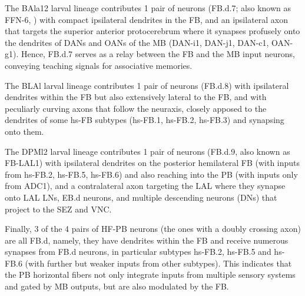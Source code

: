     The BAla12 larval lineage contributes 1 pair of neurons (FB.d.7; also known as FFN-6, \citep{eschbach2021circuits}) with compact ipsilateral dendrites in the FB, and an ipsilateral axon that targets the superior anterior protocerebrum where it synapses profusely onto the dendrites of DANs and OANs of the MB (DAN-i1, DAN-j1, DAN-c1, OAN-g1). Hence, FB.d.7 serves as a relay between the FB and the MB input neurons, conveying teaching signals for associative memories.

    The BLAl larval lineage contributes 1 pair of neurons (FB.d.8) with ipsilateral dendrites within the FB but also extensively lateral to the FB, and with peculiarly curving axons that follow the neuraxis, closely apposed to the dendrites of some hs-FB subtypes (hs-FB.1, hs-FB.2, hs-FB.3) and synapsing onto them.

    The DPMl2 larval lineage contributes 1 pair of neurons (FB.d.9, also known as FB-LAL1) with ipsilateral dendrites on the posterior  hemilateral FB (with inputs from hs-FB.2, hs-FB.5, hs-FB.6) and also reaching into the PB (with inputs only from ADC1), and a contralateral axon targeting the LAL where they synapse onto LAL LNs, EB.d neurons, and multiple descending neurons (DNs) that project to the SEZ and VNC.

    Finally, 3 of the 4 pairs of HF-PB neurons (the ones with a doubly crossing axon) are all FB.d, namely, they have dendrites within the FB and receive numerous synapses from FB.d neurons, in particular subtypes hs-FB.2, hs-FB.5 and hs-FB.6 (with further but weaker inputs from other subtypes). This indicates that the PB horizontal fibers not only integrate inputs from multiple sensory systems and gated by MB outputs, but are also modulated by the FB.


